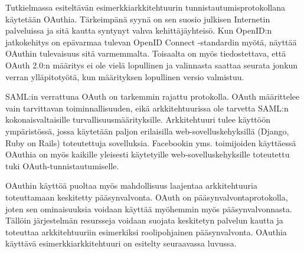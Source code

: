 Tutkielmassa esiteltävän esimerkkiarkkitehtuurin tunnistautumisprotokollana käytetään OAuthia. Tärkeimpänä syynä on sen suosio julkisen Internetin palveluissa ja sitä kautta syntynyt vahva kehittäjäyhteisö. Kun OpenID:n jatkokehitys on epävarmaa tulevan OpenID Connect -standardin myötä, näyttää OAuthin tulevaisuus sitä varmemmalta. Toisaalta on myös tiedostettava, että OAuth 2.0:n määritys ei ole vielä lopullinen ja valinnasta saattaa seurata jonkun verran ylläpitotyötä, kun määrityksen lopullinen versio valmistuu.

SAML:in verrattuna OAuth on tarkemmin rajattu protokolla. OAuth määrittelee vain tarvittavan toiminnallisuuden, eikä arkkitehtuurissa ole tarvetta SAML:n kokonaisvaltaisille turvallisuusmäärityksille. Arkkitehtuuri tulee käyttöön ympäristössä, jossa käytetään paljon erilaisilla web-sovelluskehyksillä (Django, Ruby on Rails) toteutettuja sovelluksia. Facebookin yms. toimijoiden käyttäessä OAuthia on myös kaikille yleisesti käytetyille web-sovelluskehyksille toteutettu tuki OAuth-tunnistautumiselle.

OAuthin käyttöä puoltaa myös mahdollisuus laajentaa arkkitehtuuria toteuttamaan keskitetty pääsynvalvonta. OAuth on pääsynvalvontaprotokolla, joten sen ominaisuuksia voidaan käyttää myöhemmin myös pääsynvalvonnasta. Tällöin järjestelmän resursseja voidaan suojata keskitetyn palvelun kautta ja toteuttaa arkkitehtuuriin esimerkiksi roolipohjainen pääsynvalvonta. OAuthia käyttävä esimerkkiarkkitehtuuri on esitelty seuraavassa luvussa.